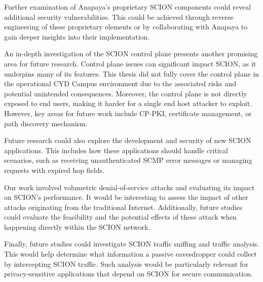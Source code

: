 Further examination of Anapaya's proprietary SCION components could reveal additional security vulnerabilities.
This could be achieved through reverse engineering of these proprietary elements or by collaborating with Anapaya to gain deeper insights into their implementation.

An in-depth investigation of the SCION control plane presents another promising area for future research.
Control plane issues can significant impact SCION, as it underpins many of its features.
This thesis did not fully cover the control plane in the operational CYD Campus environment due to the associated risks and potential unintended consequences.
Moreover, the control plane is not directly exposed to end users, making it harder for a single end host attacker to exploit.
However, key areas for future work include CP-PKI, certificate management, or path discovery mechanism.

Future research could also explore the development and security of new SCION applications.
This includes how these applications should handle critical scenarios, such as receiving unauthenticated SCMP error messages or managing requests with expired hop fields.

Our work involved volumetric denial-of-service attacks and evaluating its impact on SCION's performance.
It would be interesting to assess the impact of other attacks originating from the traditional Internet.
Additionally, future studies could evaluate the feasibility and the potential effects of these attack when happening directly within the SCION network.

Finally, future studies could investigate SCION traffic sniffing and traffic analysis.
This would help determine what information a passive eavesdropper could collect by intercepting SCION traffic.
Such analysis would be particularly relevant for privacy-sensitive applications that depend on SCION for secure communication.

